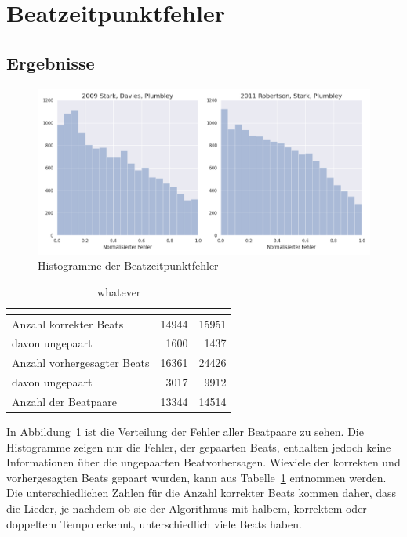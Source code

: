 \section{Beatzeitpunktfehler}
{
	\label{ergebnisse/beatzeitpunktfehler}

	\subsection{Ergebnisse}
	{
		\begin{figure}[h]
			\centering
			\includegraphics[scale=0.47]{resources/beat_positions.png}
			\caption{Histogramme der Beatzeitpunktfehler}
			\label{fig:beaterror}
		\end{figure}

		\begin{table}[h]
			\centering
			\begin{tabular}{l | r | r}
				                            & \cite{2009_DaPlSt} & \cite{2011_PlRoSt} \\
				\hline \hline
				Anzahl korrekter Beats      & \num{14944}        & \num{15951}        \\
				davon ungepaart             &  \num{1600}        &  \num{1437}        \\
				\hline
				Anzahl vorhergesagter Beats & \num{16361}        & \num{24426}        \\
				davon ungepaart             &  \num{3017}        &  \num{9912}        \\
				\hline
				Anzahl der Beatpaare        & \num{13344}        & \num{14514}
			\end{tabular}
			\caption{whatever}
			\label{tab:pairnum}
		\end{table}

		In Abbildung~\ref{fig:beaterror} ist die Verteilung der Fehler aller Beatpaare zu sehen.
		Die Histogramme zeigen nur die Fehler,
			der gepaarten Beats,
			enthalten jedoch keine Informationen über die ungepaarten Beatvorhersagen.
		Wieviele der korrekten und vorhergesagten Beats gepaart wurden,
			kann aus Tabelle~\ref{tab:pairnum} entnommen werden.
		Die unterschiedlichen Zahlen für die Anzahl korrekter Beats kommen daher,
			dass die Lieder,
			je nachdem ob sie der Algorithmus mit halbem, korrektem oder doppeltem Tempo erkennt,
			unterschiedlich viele Beats haben.
	}

}
